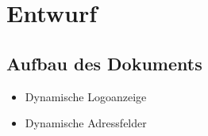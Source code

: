 \chapter{Entwurf}

\section{Aufbau des Dokuments}
\begin{itemize}
	\item Dynamische Logoanzeige
	\item Dynamische Adressfelder
	
\end{itemize}